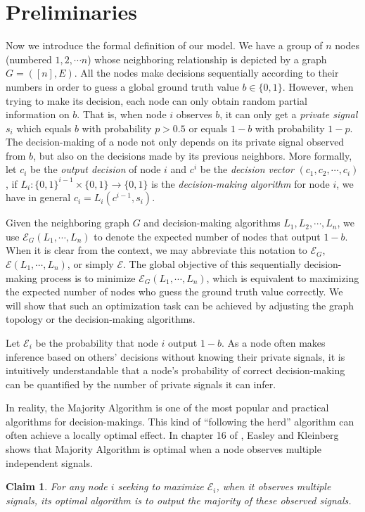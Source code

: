 \documentclass[a4paper,UKenglish]{lipics}
\newtheorem{clm}[thm]{Claim}
\theoremstyle{definition}
\begin{document}
\section{Preliminaries}

Now we introduce the formal definition of our model. 
We have a group of $n$ nodes (numbered $1,2,\cdots n$) whose neighboring relationship is depicted by a graph $G = ([n],E)$. 
All the nodes make decisions sequentially according to their numbers in order to guess a global ground truth value $b\in\{0,1\}$. 
However, when trying to make its decision, each node can only obtain random partial information on $b$. 
That is, when node $i$ observes $b$, 
	it can only get a \emph{private signal} $s_i$ which equals $b$ with probability $p>0.5$ or equals $1-b$ with probability $1-p$.  
The decision-making of a node not only depends on its private signal observed from $b$, 
	but also on the decisions made by its previous neighbors. 
More formally, let $c_i$ be the \emph{output decision} of node $i$ and $c^i$ be the \emph{decision vector} $(c_1, c_2, \cdots, c_i)$, 
	if $ L_i : \{0,1\}^{i-1}\times \{0,1\} \to \{0,1\} $ is the \emph{decision-making algorithm} for node $i$,  we have in general $c_i = L_i(c^{i-1}, s_i)$.

Given the neighboring graph $G$ and decision-making algorithms $L_1, L_2, \cdots, L_n$, 
	we use $\mathcal{E}_G(L_1, \dotsb, L_n)$ to denote the expected number of nodes that output $1 - b$. 
When it is clear from the context, we may abbreviate this notation to $\mathcal{E}_G$,
	$\mathcal{E}(L_1, \dotsb, L_n)$, or simply $\mathcal{E}$. 
The global objective of this sequentially decision-making process is to minimize $\mathcal{E}_G(L_1, \dotsb, L_n)$, 
	which is equivalent to maximizing the expected number of nodes who guess the ground truth value correctly. 
We will show that such an optimization task can be achieved by adjusting the graph topology or the decision-making algorithms. 

Let $\mathcal{E}_i$ be the probability that node $i$ output $1 - b$. 
As a node often makes inference based on others' decisions without knowing their private signals, 
	it is intuitively understandable that a node's probability of correct decision-making can be quantified by the number of private signals it can infer.

In reality, the Majority Algorithm is one of the most popular and practical algorithms for decision-makings. 
This kind of ``following the herd'' algorithm can often achieve a locally optimal effect. 
In chapter 16 of \cite{easley2010networks}, Easley and Kleinberg shows that Majority Algorithm is optimal when a node observes multiple independent signals.
\begin{clm}
	\label{clm:multiple is optimal}
	For any node $i$ seeking to maximize $\mathcal{E}_i$, 
		when it observes multiple signals, its optimal algorithm is to output the majority of these observed signals.
\end{clm}
\end{document}
